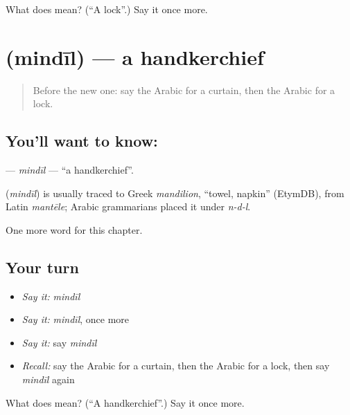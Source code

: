 \begin{tcolorbox}[breakable,colback=teal!4,colframe=teal!35!black,title={Before you move on}]
What does  mean? (\textquotedblleft{}A lock\textquotedblright{}.) Say it once more.
\end{tcolorbox}
\section[\texorpdfstring{\ar{منديل} (mindīl)}{منديل (mindīl)}]{ (mindīl) — a handkerchief}

\label{lesson:AR-C127-mindil}



\begin{quote}
Before the new one: say the Arabic for a curtain, then the Arabic for a lock.
\end{quote}

\subsection*{You'll want to know: }
\textbf{} — \emph{mindīl} — \textquotedblleft{}a handkerchief\textquotedblright{}.

\begin{cousinweb}
\textbf{} (\emph{mindīl}) is usually traced to Greek \emph{mandilion}, \textquotedblleft{}towel, napkin\textquotedblright{} (EtymDB), from Latin \emph{mantēle}; Arabic grammarians placed it under \emph{n-d-l}.
\end{cousinweb}

\begin{grammarlens}[title={What you've built}]
One more word for this chapter.
\end{grammarlens}

\subsection*{Your turn}
\begin{itemize}
\raggedright
  \item \emph{Say it:} \emph{mindīl}
  \item \emph{Say it:} \emph{mindīl}, once more
  \item \emph{Say it:} say \emph{mindīl}
  \item \emph{Recall:} say the Arabic for a curtain, then the Arabic for a lock, then say \emph{mindīl} again
\end{itemize}

\begin{tcolorbox}[breakable,colback=teal!4,colframe=teal!35!black,title={Before you move on}]
What does  mean? (\textquotedblleft{}A handkerchief\textquotedblright{}.) Say it once more.
\end{tcolorbox}
